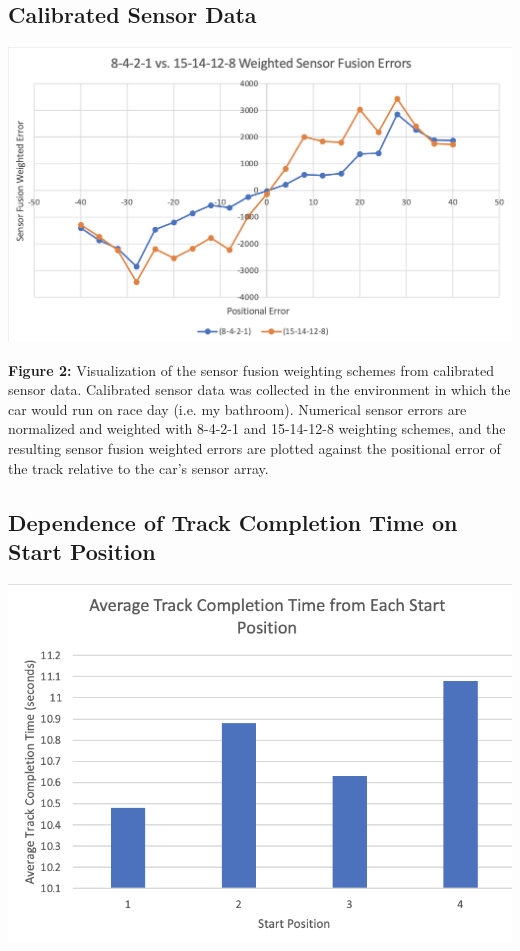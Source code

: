 \documentclass{article}
\begin{document}
\subsection{Calibrated Sensor Data}
\begin{center}
    \includegraphics[scale=0.5]{pics/sensor_fusion_new.png}    
\end{center}

\noindent \textbf{Figure 2:} Visualization of the sensor fusion weighting schemes from calibrated sensor data. Calibrated sensor data was collected in the environment in which the car would run on race day (i.e. my bathroom). Numerical sensor errors are normalized and weighted with 8-4-2-1 and 15-14-12-8 weighting schemes, and the resulting sensor fusion weighted errors are plotted against the positional error of the track relative to the car's sensor array.

\subsection{Dependence of Track Completion Time on Start Position}
\begin{center}
    \includegraphics[scale=0.7]{pics/completion_times.png}    
\end{center}
\end{document}
